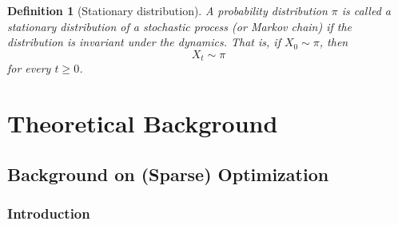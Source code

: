 \documentclass[11pt, twoside]{report}
\newtheorem*{definition*}{Definition}
\begin{document}
\begin{definition*}[Stationary distribution]
A probability distribution $\pi$ is called a stationary distribution of a stochastic process (or Markov chain) if the distribution is invariant under the dynamics. That is, if $X_0\sim\pi$, then
\[
X_t\sim\pi
\]
for every $t\ge0$.
\end{definition*}





\part{Theoretical Background}



\chapter{Background on (Sparse) Optimization} \label{chp:sparse_background}
\section{Introduction}
\end{document}
